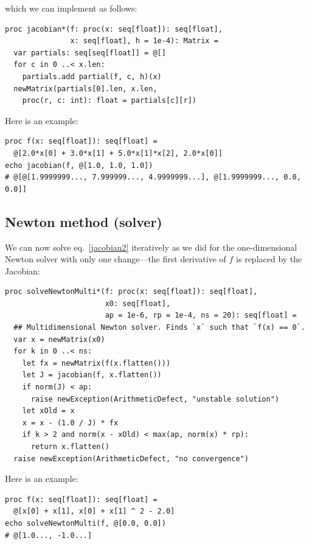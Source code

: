 \documentclass[justified, sixbynine]{tufte-book}
\def\ft{\small\tt}
\theoremstyle{plain}%
\newtheorem * {corollary}{Corollary}
\theoremstyle{definition}
\theoremstyle{remark}
\newtheorem * {remark}{Remark}
\newtheorem * {note}{Note}
\begin{document}
\begin{fullwidth}
which we can implement as follows:

\begin{lstlisting}[caption={in file: {\ft nlib.nim}}]
proc jacobian*(f: proc(x: seq[float]): seq[float],
               x: seq[float], h = 1e-4): Matrix =
  var partials: seq[seq[float]] = @[]
  for c in 0 ..< x.len:
    partials.add partial(f, c, h)(x)
  newMatrix(partials[0].len, x.len,
    proc(r, c: int): float = partials[c][r])
\end{lstlisting}

Here is an example:

\begin{lstlisting}
proc f(x: seq[float]): seq[float] =
  @[2.0*x[0] + 3.0*x[1] + 5.0*x[1]*x[2], 2.0*x[0]]
echo jacobian(f, @[1.0, 1.0, 1.0])
# @[@[1.9999999..., 7.999999..., 4.9999999...], @[1.9999999..., 0.0, 0.0]]
\end{lstlisting}

\goodbreak\subsection{Newton method (solver)}


We can now solve eq.~\ref{jacobian2} iteratively as we did for the one-dimensional Newton solver with only one change---the first derivative of $f$ is replaced by the Jacobian:

\begin{lstlisting}[caption={in file: {\ft nlib.nim}}]
proc solveNewtonMulti*(f: proc(x: seq[float]): seq[float],
                       x0: seq[float],
                       ap = 1e-6, rp = 1e-4, ns = 20): seq[float] =
  ## Multidimensional Newton solver. Finds `x` such that `f(x) == 0`.
  var x = newMatrix(x0)
  for k in 0 ..< ns:
    let fx = newMatrix(f(x.flatten()))
    let J = jacobian(f, x.flatten())
    if norm(J) < ap:
      raise newException(ArithmeticDefect, "unstable solution")
    let xOld = x
    x = x - (1.0 / J) * fx
    if k > 2 and norm(x - xOld) < max(ap, norm(x) * rp):
      return x.flatten()
  raise newException(ArithmeticDefect, "no convergence")
\end{lstlisting}

Here is an example:

\begin{lstlisting}
proc f(x: seq[float]): seq[float] =
  @[x[0] + x[1], x[0] + x[1] ^ 2 - 2.0]
echo solveNewtonMulti(f, @[0.0, 0.0])
# @[1.0..., -1.0...]
\end{lstlisting}


\end{fullwidth}
\end{document}
